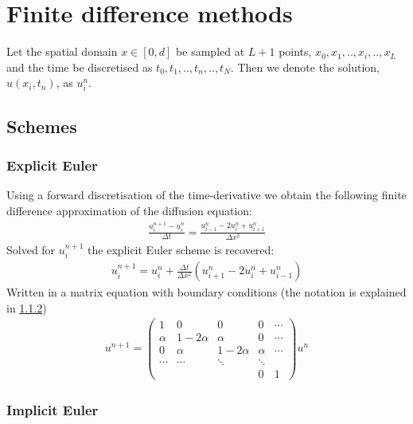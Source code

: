 \documentclass[11pt,a4paper,draft]{article}
\numberwithin{equation}{section}
\begin{document}
\section{Finite difference methods}

Let the spatial domain $x \in [0,d]$ be sampled at $L+1$ points, $x_0,x_1,..,x_i,..,x_L$ and the time be discretised as $t_0,t_1,..,t_n,..,t_N$. Then we denote the solution, $u(x_i,t_n)$, as $u_i^n$.  

\subsection{Schemes}

\subsubsection{Explicit Euler}
Using a forward discretisation of the time-derivative we obtain the following finite difference approximation of the diffusion equation:
\begin{align}
\frac{u_{i}^{n+1}-u_{i}^{n}}{\Delta t} = \frac{u_{i-1}^{n}-2u_{i}^{n}+u_{i+1}^{n}}{\Delta x^2}
\end{align}
Solved for $u_{i}^{n+1}$ the explicit Euler scheme is recovered:
\begin{gather}
u_i^{n+1} = u_i^n + \frac{\Delta t}{\Delta x^2}\left(
u_{i+1}^n - 2u_i^n + u_{i-1}^n
\right)
\end{gather}
Written in a matrix equation with boundary conditions (the notation 
is explained in \ref{subsubsec:implicit_euler})
\begin{gather}
u^{n+1} = 
\begin{pmatrix}
1 & 0 & 0 & 0 & \cdots\\
\alpha & 1 - 2\alpha & \alpha & 0 & \cdots\\
0 & \alpha & 1-2\alpha & \alpha & \cdots\\
\cdots & \cdots & \ddots & \ddots& \\
&&& 0 & 1
\end{pmatrix}u^n
\end{gather}


\subsubsection{Implicit Euler}
\label{subsubsec:implicit_euler}
\end{document}
